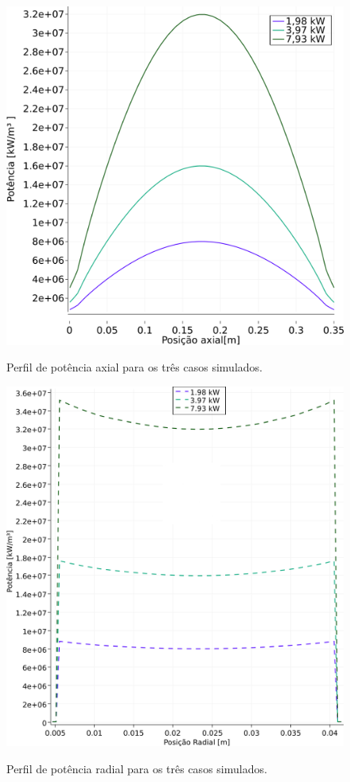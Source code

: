 \begin{figure}[htb]
  \caption{Perfil de potência axial para os três casos simulados.}
  \centering\includegraphics[scale=0.5]{figuras/Q_all_NC_port.png}
  \label{fig:perf-nac-axial}
\end{figure}

\begin{figure}[htb]
  \caption[Perfil de potência radial para os três casos simulados.]{Perfil de potência radial para os três casos simulados.}
  \centering\includegraphics[scale=0.5]{figuras/Q_x_NC_square_port.png}
  \label{fig:perf-Q-nac-radial}
\end{figure}

